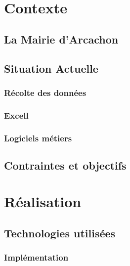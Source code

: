 \documentclass[11pt,french]{memoir}
\begin{document}
	\tableofcontents

	\mainmatter


	\chapter{Contexte}\label{ch:contexte}


	\section{La Mairie d'Arcachon}\label{sec:la-mairie-d'arcachon}


	\section{Situation Actuelle}\label{sec:situation-actuelle}

	\subsection{Récolte des données}\label{subsec:recolte-des-donnees}

	\subsection{Excell}\label{subsec:excell}

	\subsection{Logiciels métiers}\label{subsec:logiciels-metiers}


	\section{Contraintes et objectifs}\label{sec:contraintes-et-objectifs}


	\chapter{Réalisation}\label{ch:realisation}


	\section{Technologies utilisées}\label{sec:technologies-utilisees}

	\subsection{Implémentation}\label{subsec:livrables-et-developpement}
\end{document}
